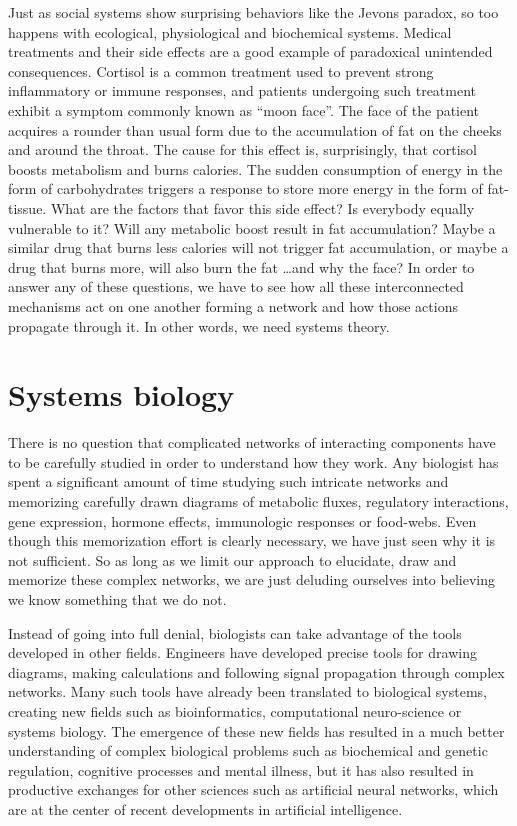 \documentclass{tufte-book} %
\begin{document}
Just as social systems show surprising behaviors like the Jevons paradox, so too happens with ecological, physiological and biochemical systems. Medical treatments and their side effects are a good example of paradoxical  unintended consequences. Cortisol is a common treatment used to prevent strong inflammatory or immune responses, and patients undergoing such treatment exhibit a symptom commonly known as ``moon face''. The face of the patient acquires a rounder than usual form due to the accumulation of fat on the cheeks and around the throat. The cause for this effect is, surprisingly, that cortisol boosts metabolism and burns calories. The sudden consumption of energy in the form of carbohydrates triggers a response to store more energy in the form of fat-tissue. What are the factors that favor this side effect? Is everybody equally vulnerable to it? Will any metabolic boost result in fat accumulation? Maybe a similar drug that burns less calories will not trigger fat accumulation, or maybe a drug that burns more, will also burn the fat \dots  and why the face?  In order to answer any of these questions, we have to see how all these interconnected mechanisms act on one another forming a network and how those actions propagate through it. In other words, we need systems theory.


\section{Systems biology}

There is no question that complicated networks of interacting components have to be carefully studied in order to understand how they work. Any biologist has spent a significant amount of time studying such intricate networks and memorizing carefully drawn diagrams of metabolic fluxes, regulatory interactions, gene expression, hormone effects, immunologic responses or food-webs. Even though this memorization effort is clearly necessary, we have just seen why it is not sufficient. So as long as we limit our approach to elucidate, draw and memorize these complex networks, we are just deluding ourselves into  believing we know something that we do not.

Instead of going into full denial, biologists can take advantage of the tools developed in other fields. Engineers have developed precise tools for drawing diagrams, making calculations and following signal propagation through complex networks. Many such tools have already been translated to biological systems, creating new fields such as bioinformatics, computational neuro-science or systems biology. The emergence of these new fields has resulted in a much better understanding of complex biological problems such as biochemical and genetic regulation, cognitive processes and mental illness, but it has also resulted in productive exchanges for other sciences such as artificial neural networks, which are at the center of recent developments in artificial intelligence.
\end{document}
